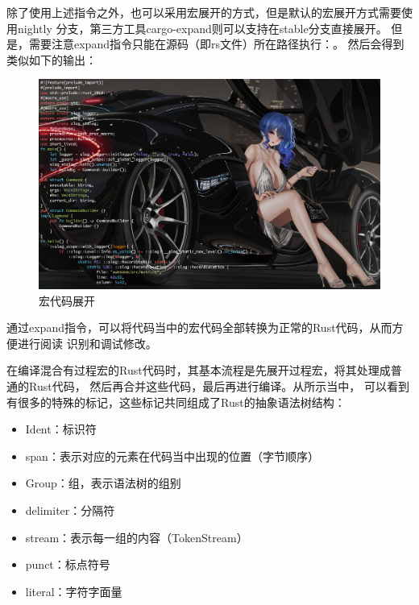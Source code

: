 除了使用上述指令之外，也可以采用宏展开的方式，但是默认的宏展开方式需要使用nightly
分支，第三方工具cargo-expand则可以支持在stable分支直接展开。
但是，需要注意expand指令只能在源码（即rs文件）所在路径执行：。
然后会得到类似如下的输出：
\begin{figure}[H]
  \centering
  \includegraphics[width=\linewidth]{rust_cargo_expand.png}
  \caption{宏代码展开}
  \label{fig:rust_cargo_expand}
\end{figure}
通过expand指令，可以将代码当中的宏代码全部转换为正常的Rust代码，从而方便进行阅读
识别和调试修改。

在编译混合有过程宏的Rust代码时，其基本流程是先展开过程宏，将其处理成普通的Rust代码，
然后再合并这些代码，最后再进行编译。从所示当中，
可以看到有很多的特殊的标记，这些标记共同组成了Rust的抽象语法树结构：
\begin{itemize}
  \item Ident：标识符
  \item span：表示对应的元素在代码当中出现的位置（字节顺序）
  \item Group：组，表示语法树的组别
  \item delimiter：分隔符
  \item stream：表示每一组的内容（TokenStream）
  \item punct：标点符号
  \item literal：字符字面量
\end{itemize}

